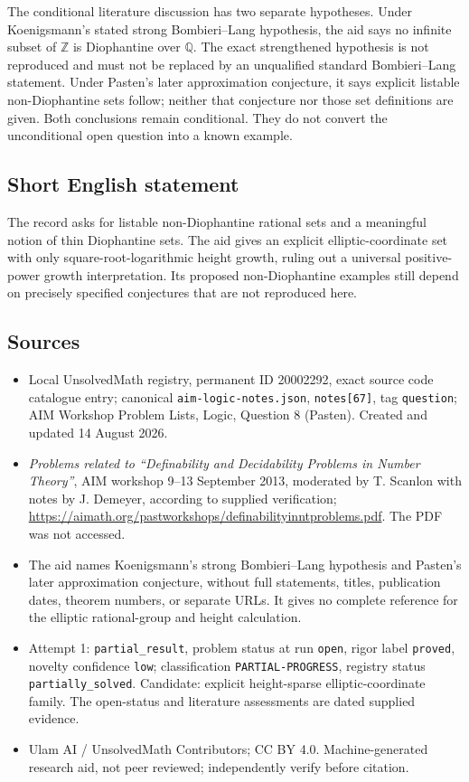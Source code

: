 \documentclass[11pt]{article}
\newcommand{\Z}{\mathbb{Z}}
\newcommand{\Q}{\mathbb{Q}}
\begin{document}
The conditional literature discussion has two separate hypotheses. Under Koenigsmann's stated strong Bombieri--Lang hypothesis, the aid says no infinite subset of \(\Z\) is Diophantine over \(\Q\). The exact strengthened hypothesis is not reproduced and must not be replaced by an unqualified standard Bombieri--Lang statement. Under Pasten's later approximation conjecture, it says explicit listable non-Diophantine sets follow; neither that conjecture nor those set definitions are given. Both conclusions remain conditional. They do not convert the unconditional open question into a known example.
\subsection{Short English statement}
The record asks for listable non-Diophantine rational sets and a meaningful notion of thin Diophantine sets. The aid gives an explicit elliptic-coordinate set with only square-root-logarithmic height growth, ruling out a universal positive-power growth interpretation. Its proposed non-Diophantine examples still depend on precisely specified conjectures that are not reproduced here.
\subsection{Sources}
\begin{itemize}
\item Local UnsolvedMath registry, permanent ID 20002292, exact source code catalogue entry; canonical \texttt{aim-logic-notes.json}, \texttt{notes[67]}, tag \texttt{question}; AIM Workshop Problem Lists, Logic, Question 8 (Pasten). Created and updated 14 August 2026.
\item \emph{Problems related to ``Definability and Decidability Problems in Number Theory''}, AIM workshop 9--13 September 2013, moderated by T. Scanlon with notes by J. Demeyer, according to supplied verification; \url{https://aimath.org/pastworkshops/definabilityinntproblems.pdf}. The PDF was not accessed.
\item The aid names Koenigsmann's strong Bombieri--Lang hypothesis and Pasten's later approximation conjecture, without full statements, titles, publication dates, theorem numbers, or separate URLs. It gives no complete reference for the elliptic rational-group and height calculation.
\item Attempt 1: \texttt{partial\_result}, problem status at run \texttt{open}, rigor label \texttt{proved}, novelty confidence \texttt{low}; classification \texttt{PARTIAL-PROGRESS}, registry status \texttt{partially\_solved}. Candidate: explicit height-sparse elliptic-coordinate family. The open-status and literature assessments are dated supplied evidence.
\item Ulam AI / UnsolvedMath Contributors; CC BY 4.0. Machine-generated research aid, not peer reviewed; independently verify before citation.
\end{itemize}
\end{document}
